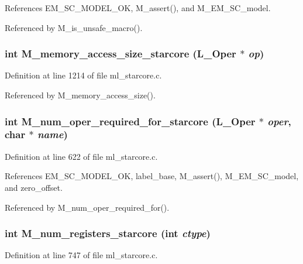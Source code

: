 References EM\_\-SC\_\-MODEL\_\-OK, M\_\-assert(), and M\_\-EM\_\-SC\_\-model.

Referenced by M\_\-is\_\-unsafe\_\-macro().
\subsubsection{\setlength{\rightskip}{0pt plus 5cm}int M\_\-memory\_\-access\_\-size\_\-starcore (L\_\-Oper $\ast$ {\em op})}\label{m__starcore_8h_3214ba36268c4776cf9d904f6dc1dbc0}




Definition at line 1214 of file ml\_\-starcore.c.

Referenced by M\_\-memory\_\-access\_\-size().
\subsubsection{\setlength{\rightskip}{0pt plus 5cm}int M\_\-num\_\-oper\_\-required\_\-for\_\-starcore (L\_\-Oper $\ast$ {\em oper}, char $\ast$ {\em name})}\label{m__starcore_8h_51e99e7bb8f7f26f61297f566b3faede}




Definition at line 622 of file ml\_\-starcore.c.

References EM\_\-SC\_\-MODEL\_\-OK, label\_\-base, M\_\-assert(), M\_\-EM\_\-SC\_\-model, and zero\_\-offset.

Referenced by M\_\-num\_\-oper\_\-required\_\-for().
\subsubsection{\setlength{\rightskip}{0pt plus 5cm}int M\_\-num\_\-registers\_\-starcore (int {\em ctype})}\label{m__starcore_8h_58eed033ec1c25bf3526aa3c5a607829}




Definition at line 747 of file ml\_\-starcore.c.

